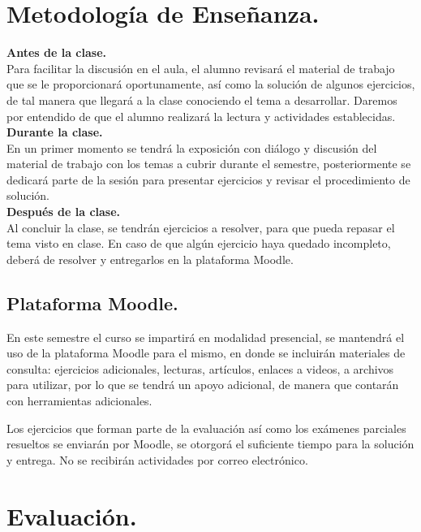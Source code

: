 \section{Metodología de Enseñanza.}

\noindent
\textbf{Antes de la clase.}
\\
Para facilitar la discusión en el aula, el alumno revisará el material de trabajo que se le proporcionará oportunamente, así como la solución de algunos ejercicios, de tal manera que llegará a la clase conociendo el tema a desarrollar. Daremos por entendido de que el alumno realizará la lectura y actividades establecidas.
\\
\textbf{Durante la clase.}
\\
En un primer momento se tendrá la exposición con diálogo y discusión del material de trabajo con los temas a cubrir durante el semestre, posteriormente se dedicará parte de la sesión para presentar ejercicios y revisar el procedimiento de solución.
\\
\textbf{Después de la clase.}
\\
Al concluir la clase, se tendrán ejercicios a resolver, para que pueda repasar el tema visto en clase. En caso de que algún ejercicio haya quedado incompleto, deberá de resolver y entregarlos en la plataforma Moodle.

\subsection{Plataforma Moodle.}

En este semestre el curso se impartirá en modalidad presencial, se mantendrá el uso de la plataforma Moodle para el mismo, en donde se incluirán materiales de consulta: ejercicios adicionales, lecturas, artículos, enlaces a videos, a archivos para utilizar, por lo que se tendrá un apoyo adicional, de manera que contarán con herramientas adicionales.
\par
Los ejercicios que forman parte de la evaluación así como los exámenes parciales resueltos se enviarán por Moodle, se otorgorá el suficiente tiempo para la solución y entrega. No se recibirán actividades por correo electrónico.

\section{Evaluación.}

